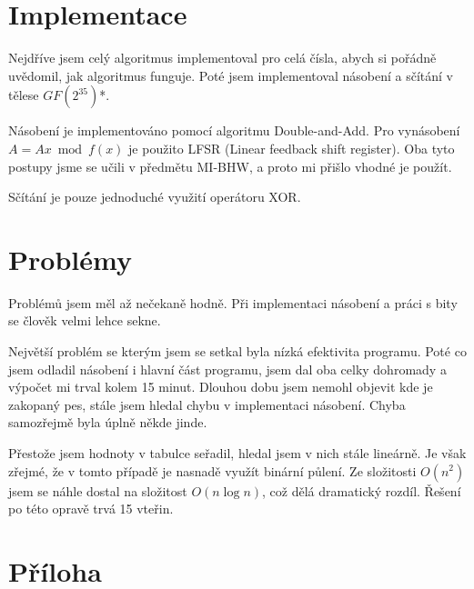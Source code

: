 \documentclass[czech,a4paper,11pt]{article}
\begin{document}
\section{Implementace}

Nejdříve jsem celý algoritmus implementoval pro celá čísla, abych si pořádně uvědomil, jak algoritmus funguje. Poté jsem implementoval násobení a sčítání v tělese $GF(2^{35})$\mbox{*}.

Násobení je implementováno pomocí algoritmu Double-and-Add. Pro vynásobení $A=Ax \bmod {f(x)}$ je použito LFSR (Linear feedback shift register). Oba tyto postupy jsme se učili v předmětu MI-BHW, a proto mi přišlo vhodné je použít.

Sčítání je pouze jednoduché využití operátoru XOR.

\section{Problémy}
Problémů jsem měl až nečekaně hodně. Při implementaci násobení a práci s bity se člověk velmi lehce sekne.

Největší problém se kterým jsem se setkal byla nízká efektivita programu. Poté co jsem odladil násobení i hlavní část programu, jsem dal oba celky dohromady a výpočet mi trval kolem 15 minut. Dlouhou dobu jsem nemohl objevit kde je zakopaný pes, stále jsem hledal chybu v implementaci násobení. Chyba samozřejmě byla úplně někde jinde.

Přestože jsem hodnoty v tabulce seřadil, hledal jsem v nich stále lineárně. Je však zřejmé, že v tomto případě je nasnadě využít binární půlení. Ze složitosti $O(n^2)$ jsem se náhle dostal na složitost $O(n\log{}n)$, což dělá dramatický rozdíl. Řešení po této opravě trvá 15 vteřin.


\section{Příloha}
\end{document}

